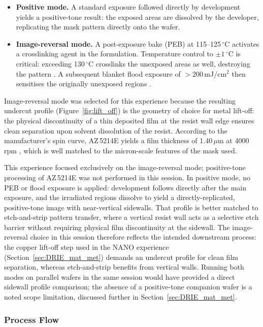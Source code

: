 \begin{itemize}
  \item \textbf{Positive mode.} A standard exposure followed directly by
    development yields a positive-tone result: the exposed areas are dissolved
    by the developer, replicating the mask pattern directly onto the wafer.
  \item \textbf{Image-reversal mode.} A post-exposure bake (PEB) at
    115--125\,$^\circ$C activates a crosslinking agent in the formulation.
    Temperature control to $\pm 1\,^\circ$C is critical: exceeding
    130\,$^\circ$C crosslinks the unexposed areas as well, destroying the
    pattern \cite{AZ5214E_TDS}. A subsequent blanket flood exposure of
    $>200$\,mJ/cm$^2$ then sensitises the originally unexposed regions
    \cite{AZ5214E_TDS}.
\end{itemize}

Image-reversal mode was selected for this experience because the
resulting undercut
profile (Figure~\ref{fig:lift_off}) is the geometry of
choice for metal lift-off: the physical discontinuity of a thin
deposited film at
the resist wall edge ensures clean separation upon solvent
dissolution of the resist.
According to the manufacturer's spin curve, AZ\,5214E yields a film thickness of
1.40\,$\mu$m at 4000\,rpm \cite{AZ5214E_TDS}, which is well matched to the
micron-scale features of the mask used.

This experience focused exclusively on the image-reversal mode;
positive-tone processing of AZ\,5214E was not performed in this
session. In positive mode, no PEB or flood exposure is applied:
development follows directly after the main exposure, and the
irradiated regions dissolve to yield a directly-replicated,
positive-tone image with near-vertical sidewalls. That profile is
better matched to etch-and-strip pattern transfer, where a vertical
resist wall acts as a selective etch barrier without requiring
physical film discontinuity at the sidewall. The image-reversal
choice in this session therefore reflects the intended downstream
process: the copper lift-off step used in the NANO experience
(Section~\ref{sec:DRIE_mat_met}) demands an undercut profile for
clean film separation, whereas etch-and-strip benefits from vertical
walls. Running both modes on parallel wafers in the same session
would have provided a direct sidewall profile comparison; the absence
of a positive-tone companion wafer is a noted scope limitation,
discussed further in Section~\ref{sec:DRIE_mat_met}.

\subsubsection{Process Flow}

